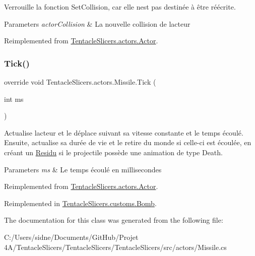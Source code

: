 Verrouille la fonction Set\+Collision, car elle n\textquotesingle{}est pas destinée à être réécrite. 


\begin{DoxyParams}{Parameters}
{\em actor\+Collision} & La nouvelle collision de l\textquotesingle{}acteur \\
\hline
\end{DoxyParams}


Reimplemented from \hyperlink{class_tentacle_slicers_1_1actors_1_1_actor_a6e1eab5bc50ecb03842f49d0dc3b136e}{Tentacle\+Slicers.\+actors.\+Actor}.

\mbox{\label{class_tentacle_slicers_1_1actors_1_1_missile_ad07d0a9fe7aa8abce9aa5df78ebbb8be}} 
\subsubsection{\texorpdfstring{Tick()}{Tick()}}
{\footnotesize\ttfamily override void Tentacle\+Slicers.\+actors.\+Missile.\+Tick (\begin{DoxyParamCaption}\item[{int}]{ms }\end{DoxyParamCaption})\hspace{0.3cm}{\ttfamily [virtual]}}



Actualise l\textquotesingle{}acteur et le déplace suivant sa vitesse constante et le temps écoulé. Ensuite, actualise sa durée de vie et le retire du monde si celle-\/ci est écoulée, en créant un \hyperlink{class_tentacle_slicers_1_1actors_1_1_residu}{Residu} si le projectile possède une animation de type Death. 


\begin{DoxyParams}{Parameters}
{\em ms} & Le temps écoulé en millisecondes \\
\hline
\end{DoxyParams}


Reimplemented from \hyperlink{class_tentacle_slicers_1_1actors_1_1_actor_a13e48a1ca022ce7c971c77f1354e3daf}{Tentacle\+Slicers.\+actors.\+Actor}.



Reimplemented in \hyperlink{class_tentacle_slicers_1_1customs_1_1_bomb_aefe2c2dcf1c3159e161f781c4d0d08d7}{Tentacle\+Slicers.\+customs.\+Bomb}.



The documentation for this class was generated from the following file\+:\begin{DoxyCompactItemize}
\item 
C\+:/\+Users/sidne/\+Documents/\+Git\+Hub/\+Projet 4\+A/\+Tentacle\+Slicers/\+Tentacle\+Slicers/\+Tentacle\+Slicers/src/actors/Missile.\+cs\end{DoxyCompactItemize}
